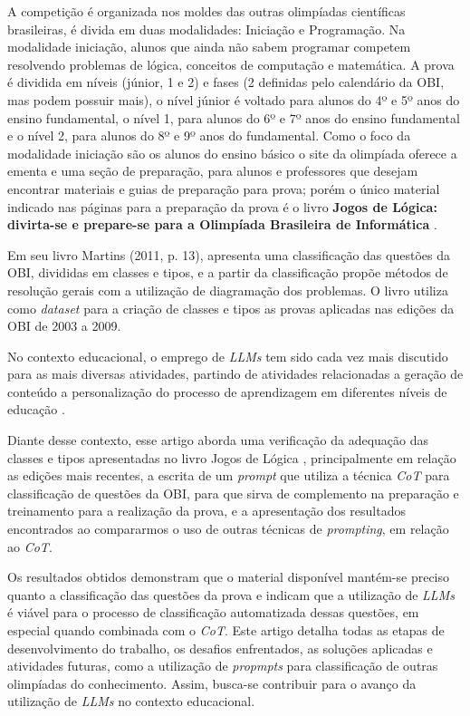 \documentclass[12pt]{article}
\begin{document}
A competição é organizada nos moldes das outras olimpíadas científicas brasileiras, é divida em duas modalidades: Iniciação e Programação. Na modalidade iniciação, alunos que ainda não sabem programar competem resolvendo problemas de lógica, conceitos de computação e matemática. A prova é dividida em níveis (júnior, 1 e 2) e fases (2 definidas pelo calendário da OBI, mas podem possuir mais), o nível júnior é voltado para alunos do 4º e 5º anos do ensino fundamental, o nível 1, para alunos do 6º e 7º anos do ensino fundamental e o nível 2, para alunos do 8º e 9º anos do fundamental. Como o foco da modalidade iniciação são os alunos do ensino básico o site da olimpíada oferece a ementa e uma seção de preparação, para alunos e professores que desejam encontrar materiais e guias de preparação para prova; porém o único material indicado nas páginas para a preparação da prova é o livro \textbf{Jogos de Lógica: divirta-se e prepare-se para a Olimpíada Brasileira de Informática} \cite{book1}.

Em seu livro Martins (2011, p. 13), apresenta uma classificação das questões da OBI, divididas em classes e tipos, e a partir da classificação propõe métodos de resolução gerais com a utilização de diagramação dos problemas. O livro utiliza como \textit{dataset} para a criação de classes e tipos as provas aplicadas nas edições da OBI de 2003 a 2009.

No contexto educacional, o emprego de \textit{LLMs} tem sido cada vez mais discutido para as mais diversas atividades, partindo de atividades relacionadas a geração de conteúdo \cite{article2} a personalização do processo de aprendizagem em diferentes níveis de educação \cite{article3}.

Diante desse contexto, esse artigo aborda uma verificação da adequação das classes e tipos apresentadas no livro Jogos de Lógica \cite{book1}, principalmente em relação as edições mais recentes, a escrita de um \textit{prompt} que utiliza a técnica \textit{CoT} para classificação de questões da OBI, para que sirva de complemento na preparação e treinamento para a realização da prova, e a apresentação dos resultados encontrados ao compararmos o uso de outras técnicas de \textit{prompting}, em relação ao \textit{CoT}. \cite{book2}

Os resultados obtidos demonstram que o material disponível mantém-se preciso quanto a classificação das questões da prova e indicam que a utilização de \textit{LLMs} é viável para o processo de classificação automatizada dessas questões, em especial quando combinada com o \textit{CoT}. Este artigo detalha todas as etapas de desenvolvimento do trabalho, os desafios enfrentados, as soluções aplicadas e atividades futuras, como a utilização de \textit{propmpts} para classificação de outras olimpíadas do conhecimento. Assim, busca-se contribuir para o avanço da utilização de \textit{LLMs} no contexto educacional.
\end{document}
